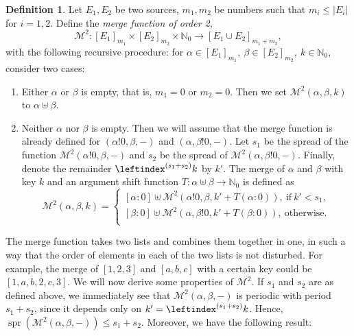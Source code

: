 \documentclass[a4paper, 10pt]{article}
\theoremstyle{plain}
\theoremstyle{definition}
\newtheorem{definition}[theorem]{Definition}
\newcommand{\N}{\mathbb{N}}
\newcommand{\wo}{\mathbin{!}}
\newcommand{\li}{\leftindex}
\newcommand{\spr}[1]{\operatorname{spr}(#1)}
\newcommand{\m}{\mathcal{M}}
\begin{document}
\begin{definition}
  \label{m2def}
  Let $E_1, E_2$ be two sources, $m_1, m_2$ be numbers such that $m_i \le |E_i|$ for $i = 1,2$. Define the \emph{merge function of order 2},
  \[
    \m^2 \colon [E_1]_{m_1} \times [E_2]_{m_2} \times \N_0 \to [E_1 \cup E_2]_{m_1 + m_2},
  \]
  with the following recursive procedure: for $\alpha \in [E_1]_{m_1},\ \beta \in [E_2]_{m_2},\ k \in \N_0$, consider two cases:
  \begin{enumerate}
    \item Either $\alpha$ or $\beta$ is empty, that is, $m_1 = 0$ or $m_2 = 0$. Then we set $\m^2 (\alpha, \beta, k)$ to $\alpha \uplus \beta$.
    \item Neither $\alpha$ nor $\beta$ is empty. Then we will assume that the merge function is already defined for $(\alpha \wo 0, \beta, -)$ and $(\alpha, \beta \wo 0, -)$. Let $s_1$ be the spread of the function $\m^2(\alpha \wo 0, \beta, -)$ and $s_2$ be the spread of $\m^2 (\alpha, \beta \wo 0, -)$. Finally, denote the remainder $\li^{(s_1+s_2)}k$ by $k'$. The merge of $\alpha$ and $\beta$ with key $k$ and an argument shift function $T \colon \alpha \uplus \beta \to \N_0$ is defined as
      \[
        \m^2(\alpha, \beta, k) = \begin{cases}
          [\alpha : 0] \uplus \m^2(\alpha \wo 0, \beta, k' + T(\alpha : 0)),\ \mathrm{if}\ k' < s_1,\\
          [\beta : 0] \uplus \m^2(\alpha, \beta \wo 0, k' + T(\beta : 0)),\ \mathrm{otherwise}.\\
        \end{cases}
      \]
  \end{enumerate}
\end{definition}
The merge function takes two lists and combines them together in one, in such a way that the order of elements in each of the two lists is not disturbed. For example, the merge of $[1,2,3]$ and $[a,b,c]$ with a certain key could be $[1,a,b,2,c,3]$. We will now derive some properties of $\m^2$. If $s_1$ and $s_2$ are as defined above, we immediately see that $\m^2(\alpha, \beta, -)$ is periodic with period $s_1 + s_2$, since it depends only on $k' = \li^{(s_1 + s_2)}k$. Hence, $\spr{\m^2 (\alpha, \beta, -)} \leq s_1 + s_2$. Moreover, we have the following result:\\
\end{document}
